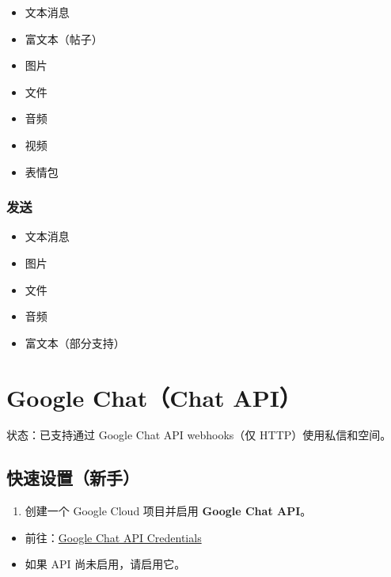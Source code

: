 \begin{itemize}
  \item {} 文本消息
  \item {} 富文本（帖子）
  \item {} 图片
  \item {} 文件
  \item {} 音频
  \item {} 视频
  \item {} 表情包
\end{itemize}


\subsubsection{发送}


\begin{itemize}
  \item {} 文本消息
  \item {} 图片
  \item {} 文件
  \item {} 音频
  \item {} 富文本（部分支持）
\end{itemize}



\clearpage

\section{Google Chat（Chat API）}


状态：已支持通过 Google Chat API webhooks（仅 HTTP）使用私信和空间。

\subsection{快速设置（新手）}


\begin{enumerate}
  \item 创建一个 Google Cloud 项目并启用 \textbf{Google Chat API}。
\end{enumerate}

\begin{itemize}
  \item 前往：\href{https://console.cloud.google.com/apis/api/chat.googleapis.com/credentials}{Google Chat API Credentials}
  \item 如果 API 尚未启用，请启用它。
\end{itemize}

